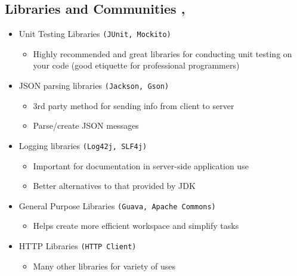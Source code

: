 \subsection{Libraries and Communities \cite{ibm_cloud_education_jvm_2023}, \cite{javinpaul_top_nodate}}
\begin{itemize}
	\item Unit Testing Libraries \texttt{(JUnit, Mockito)}
	\begin{itemize}
		\item Highly recommended and great libraries for conducting unit testing on your code (good etiquette for professional programmers)
	\end{itemize}
	
	
	\item  JSON parsing libraries \texttt{(Jackson, Gson)}
	\begin{itemize}
		\item 3rd party method for sending info from client to server
		\item Parse/create JSON messages
	\end{itemize}

	\item  Logging libraries \texttt{(Log42j, SLF4j)}
	\begin{itemize}
		\item Important for documentation in server-side application use
		\item Better alternatives to that provided by JDK
	\end{itemize}
	
	\item General Purpose Libraries \texttt{(Guava, Apache Commons)}
	\begin{itemize}
		\item Helps create more efficient workspace and simplify tasks
	\end{itemize}
	
	\item HTTP Libraries \texttt{(HTTP Client)}
	\begin{itemize}
		\item Many other libraries for variety of uses 
	\end{itemize}
\end{itemize}
